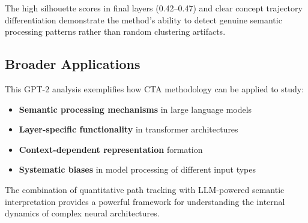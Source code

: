 The high silhouette scores in final layers (0.42--0.47) and clear concept trajectory differentiation demonstrate the method's ability to detect genuine semantic processing patterns rather than random clustering artifacts.

\subsection{Broader Applications}

This GPT-2 analysis exemplifies how CTA methodology can be applied to study:

\begin{itemize}
    \item \textbf{Semantic processing mechanisms} in large language models
    \item \textbf{Layer-specific functionality} in transformer architectures  
    \item \textbf{Context-dependent representation} formation
    \item \textbf{Systematic biases} in model processing of different input types
\end{itemize}

The combination of quantitative path tracking with LLM-powered semantic interpretation provides a powerful framework for understanding the internal dynamics of complex neural architectures.
